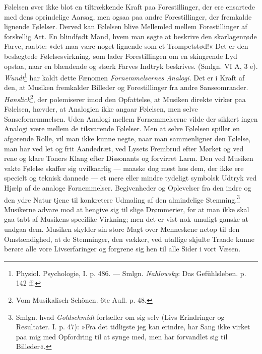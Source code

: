 \documentclass[12pt,a4paper,openany]{book}
\newcommand{\opage}[1]{\marginnote{\footnotesize\textit{[#1]}}}
\begin{document}
Følelsen øver ikke blot en tiltrækkende Kraft paa Forestillinger, der
ere ensartede med dens oprindelige Aarsag, men ogsaa paa andre
Forestillinger, der fremkalde lignende Følelser. Derved kan Følelsen
blive Mellemled mellem Forestillinger af forskellig Art. En blindfødt
Mand, hvem man søgte at beskrive den skarlagenrøde Farve, raabte: »det
maa være noget lignende som et Trompetstød!« Det er den beslægtede
Følelsesvirkning, som lader Forestillingen om en skingrende Lyd opstaa,
naar en blændende og stærk Farves Indtryk beskrives. (Smlgn. VI A, 3 e).
\emph{Wundt}\footnote[1]{Physiol. Psychologie, I. p. 486. --- Smlgn. \emph{Nahlowsky}: Das Gefühlsleben. p. 142 ff.} har kaldt dette Fænomen
\emph{Fornemmelsernes Analogi}. Det er i Kraft af den, at Musiken
\opage{362}fremkalder Billeder og Forestillinger fra andre
Sanseomraader. \emph{Hanslick}\footnote[1]{Vom Musikalisch-Schönen. 6te
Aufl. p. 48.}, der polemiserer imod den Opfattelse, at Musiken direkte
virker paa Følelsen, hævder, at Analogien ikke angaar Følelsen, men
selve Sansefornemmelsen. Uden Analogi mellem Fornemmelserne vilde der
sikkert ingen Analogi være mellem de tilsvarende Følelser. Men at selve
Følelsen spiller en afgørende Rolle, vil man ikke kunne negte, naar man
sammenligner den Følelse, man har ved let og frit Aandedræt, ved Lysets
Frembrud efter Mørket og ved rene og klare Toners Klang efter Dissonants
og forvirret Larm. Den ved Musiken vakte Følelse skaffer sig uvilkaarlig
--- maaske dog mest hos dem, der ikke ere specielt og teknisk dannede
--- et mere eller mindre tydeligt symbolsk Udtryk ved Hjælp af de
analoge Fornemmelser. Begivenheder og Oplevelser fra den indre og den
ydre Natur tjene til konkretere Udmaling af den almindelige
Stemning.\footnote[2]{Smlgn. hvad \emph{Goldschmidt} fortæller om sig
selv (Livs Erindringer og Resultater. I. p. 47): »Fra det tidligste jeg
kan erindre, har Sang ikke virket paa mig med Opfordring til at synge
med, men har forvandlet sig til Billeder«.} Musikerne advare mod at
hengive sig til slige Drømmerier, for at man ikke skal gaa tabt af
Musikens specifike Virkning; men det er vist nok umuligt ganske at
undgaa dem. Musiken skylder sin store Magt over Menneskene netop til den
Omstændighed, at de Stemninger, den vækker, ved utallige skjulte Traade
kunne berøre alle vore Livserfaringer og forgrene sig hen til alle Sider
i vort Væsen.
\end{document}
